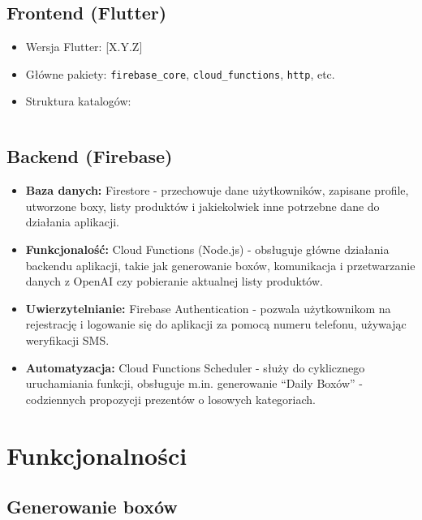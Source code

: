 \documentclass[a4paper, 12pt]{article}
\begin{document}
\newpage

\subsection{Frontend (Flutter)}
\begin{itemize}
    \item Wersja Flutter: [X.Y.Z]
    \item Główne pakiety: \texttt{firebase\_core}, \texttt{cloud\_functions}, \texttt{http}, etc.
    \item Struktura katalogów:
    \begin{lstlisting}[language=bash]
    \end{lstlisting}
\end{itemize}

\subsection{Backend (Firebase)}
\begin{itemize}
    \item \textbf{Baza danych:} Firestore - przechowuje dane użytkowników, zapisane profile, utworzone boxy, listy produktów i jakiekolwiek inne potrzebne dane do działania aplikacji.
    \item \textbf{Funkcjonalość:} Cloud Functions (Node.js) - obsługuje główne działania backendu aplikacji, takie jak generowanie boxów, komunikacja i przetwarzanie danych z OpenAI czy pobieranie aktualnej listy produktów.
    \item \textbf{Uwierzytelnianie:} Firebase Authentication - pozwala użytkownikom na rejestrację i logowanie się do aplikacji za pomocą numeru telefonu, używając weryfikacji SMS.
    \item \textbf{Automatyzacja:} Cloud Functions Scheduler - służy do cyklicznego uruchamiania funkcji, obsługuje m.in. generowanie ``Daily Boxów'' - codziennych propozycji prezentów o losowych kategoriach.
\end{itemize}

\newpage
\section{Funkcjonalności}
\subsection{Generowanie boxów}
\end{document}
